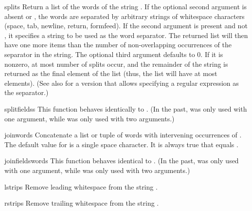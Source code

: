 \begin{funcdesc}{split}{s}
Return a list of the words of the string .  If the optional
second argument  is absent or , the words are
separated by arbitrary strings of whitespace characters (space, tab,
newline, return, formfeed).  If the second argument  is
present and not , it specifies a string to be used as the
word separator.  The returned list will then have one more items than
the number of non-overlapping occurrences of the separator in the
string.  The optional third argument  defaults to 0.  If
it is nonzero, at most  number of splits occur, and the
remainder of the string is returned as the final element of the list
(thus, the list will have at most  elements).
(See also  for a version that allows specifying a
regular expression as the separator.)
\end{funcdesc}

\begin{funcdesc}{splitfields}{s}
This function behaves identically to .  (In the past,
 was only used with one argument, while 
was only used with two arguments.)
\end{funcdesc}

\begin{funcdesc}{join}{words}
Concatenate a list or tuple of words with intervening occurrences of
.  The default value for  is a single space character.
It is always true that
equals .
\end{funcdesc}

\begin{funcdesc}{joinfields}{words}
This function behaves identical to .  (In the past,
 was only used with one argument, while 
was only used with two arguments.)
\end{funcdesc}

\begin{funcdesc}{lstrip}{s}
Remove leading whitespace from the string .
\end{funcdesc}

\begin{funcdesc}{rstrip}{s}
Remove trailing whitespace from the string .
\end{funcdesc}

